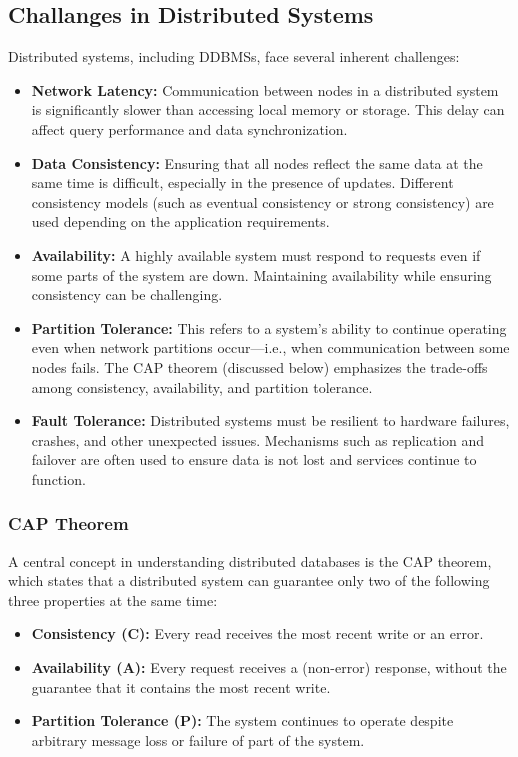 \subsection{Challanges in Distributed Systems}
Distributed systems, including DDBMSs, face several inherent challenges:
\begin{itemize}
	\item \textbf{Network Latency:} Communication between nodes in a distributed system is significantly slower than accessing local memory or storage.
		This delay can affect query performance and data synchronization.

	\item \textbf{Data Consistency:} Ensuring that all nodes reflect the same data at the same time is difficult, especially in the presence of updates.
		Different consistency models (such as eventual consistency or strong consistency) are used depending on the application requirements.

	\item \textbf{Availability:} A highly available system must respond to requests even if some parts of the system are down.
		Maintaining availability while ensuring consistency can be challenging.

	\item \textbf{Partition Tolerance:} This refers to a system's ability to continue operating even when network partitions occur—i.e., when communication between some nodes fails.
		The CAP theorem (discussed below) emphasizes the trade-offs among consistency, availability, and partition tolerance.

	\item \textbf{Fault Tolerance:} Distributed systems must be resilient to hardware failures, crashes, and other unexpected issues.
		Mechanisms such as replication and failover are often used to ensure data is not lost and services continue to function.
\end{itemize}

\subsubsection{CAP Theorem}
A central concept in understanding distributed databases is the CAP theorem, which states that a distributed system can guarantee only two of the following three properties at the same time:

\begin{itemize}
	\item \textbf{Consistency (C):} Every read receives the most recent write or an error.
	\item \textbf{Availability (A):} Every request receives a (non-error) response, without the guarantee that it contains the most recent write.
	\item \textbf{Partition Tolerance (P):} The system continues to operate despite arbitrary message loss or failure of part of the system.
\end{itemize}

